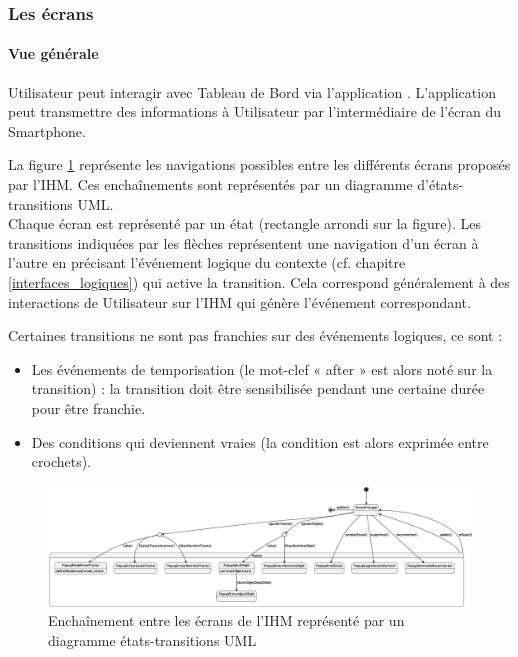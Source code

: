 \newpage
\subsubsection{Les écrans}
\paragraph{Vue générale}

Utilisateur peut interagir avec Tableau de Bord via l'application {\nomApplication}. L'application {\nomApplication} peut transmettre des informations à Utilisateur par l'intermédiaire de l'écran du Smartphone. \newline

La figure \ref{schemaMAE} représente les navigations possibles entre les différents écrans proposés par l'IHM. Ces enchaînements sont représentés par un diagramme d'états-transitions UML. \\
Chaque écran est représenté par un état (rectangle arrondi sur la figure). Les transitions indiquées par les flèches représentent une navigation d'un écran à l'autre en précisant l'événement logique du contexte (cf. chapitre \ref{interfaces_logiques}) qui active la transition. Cela correspond généralement à des interactions de Utilisateur sur l'IHM qui génère l'événement correspondant.
\newline

Certaines transitions ne sont pas franchies sur des événements logiques, ce sont :
\begin{itemize}
    \item Les événements de temporisation (le mot-clef « after » est alors noté sur la transition) : la transition doit être sensibilisée pendant une certaine durée pour être franchie.
    \item Des conditions qui deviennent vraies (la condition est alors exprimée entre crochets).
\end{itemize}

\begin{figure}[ht] 
    \centering
    \includegraphics[width=16cm]{../schemas/MAE}
    \captionsetup{justification=centering}
    \caption{Enchaînement entre les écrans de l'IHM représenté par un diagramme états-transitions UML}
    \label{schemaMAE}
\end{figure}

